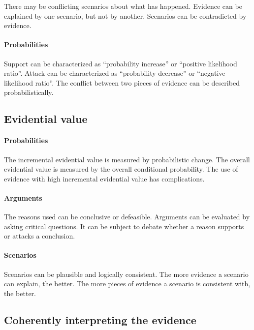 \documentclass[10pt]{article}
\begin{document}
There may be conflicting scenarios about what has happened.
Evidence can be explained by one scenario, but not by another.
Scenarios can be contradicted by evidence.

\paragraph{Probabilities}

Support can be characterized as ``probability increase'' or ``positive likelihood ratio''.
Attack can be characterized as ``probability decrease'' or ``negative likelihood ratio''.
The conflict between two pieces of evidence can be described probabilistically.

\subsection*{Evidential value}

\paragraph{Probabilities}

The incremental evidential value is measured by probabilistic change.
The overall evidential value is measured by the overall conditional probability. 
The use of evidence with high incremental evidential value has complications.
	
\paragraph{Arguments}

The reasons used can be conclusive or defeasible.
Arguments can be evaluated by asking critical questions.
It can be subject to debate whether a reason supports or attacks a conclusion.
	
\paragraph{Scenarios}

Scenarios can be plausible and logically consistent.
The more evidence a scenario can explain, the better.
The more pieces of evidence a scenario is consistent with, the better.
	
\subsection*{Coherently interpreting the evidence}
\end{document}
